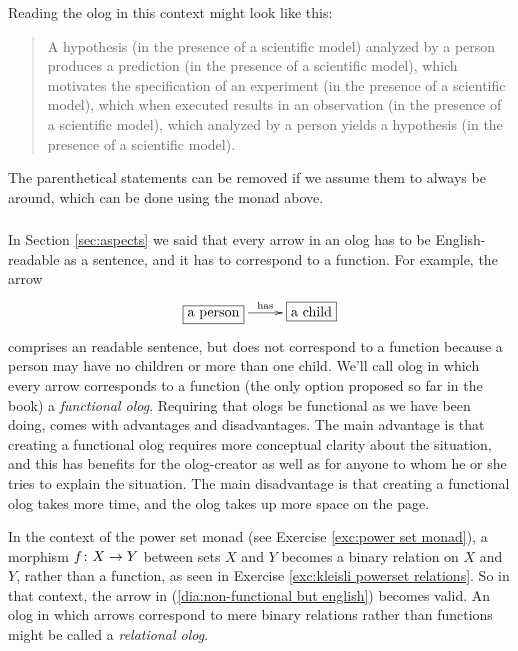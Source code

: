 \documentclass[CT4S-EN-RU]{subfiles}
\begin{document}
\begin{example}
Reading the olog in this context might look like this:

\begin{quote}
A hypothesis (in the presence of a scientific model) analyzed by a person produces a prediction (in the presence of a scientific model), which motivates the specification of an experiment (in the presence of a scientific model), which when executed results in an observation (in the presence of a scientific model), which analyzed by a person yields a hypothesis (in the presence of a scientific model).
\end{quote}

The parenthetical statements can be removed if we assume them to always be around, which can be done using the monad above.

\end{example}


\subsubsection{}\label{sec:relaxing ologs}

In Section \ref{sec:aspects} we said that every arrow in an olog has to be English-readable as a sentence, and it has to correspond to a function. For example, the arrow 
\begin{align}\label{dia:non-functional but english}
\xymatrix{\fbox{a person}\LA{r}{has}&\fbox{a child}}
\end{align}
comprises an readable sentence, but does not correspond to a function because a person may have no children or more than one child. 
We'll call olog in which every arrow corresponds to a function (the only option proposed so far in the book) a {\em functional olog}. Requiring that ologs be functional as we have been doing, comes with advantages and disadvantages. The main advantage is that creating a functional olog requires more conceptual clarity about the situation, and this has benefits for the olog-creator as well as for anyone to whom he or she tries to explain the situation. The main disadvantage is that creating a functional olog takes more time, and the olog takes up more space on the page.

In the context of the power set monad (see Exercise \ref{exc:power set monad}), a morphism $f\colon X\rightarrow Y$ between sets $X$ and $Y$ becomes a binary relation on $X$ and $Y$, rather than a function, as seen in Exercise \ref{exc:kleisli powerset relations}. So in that context, the arrow in (\ref{dia:non-functional but english}) becomes valid. An olog in which arrows correspond to mere binary relations rather than functions might be called a {\em relational olog}.
\end{document}
